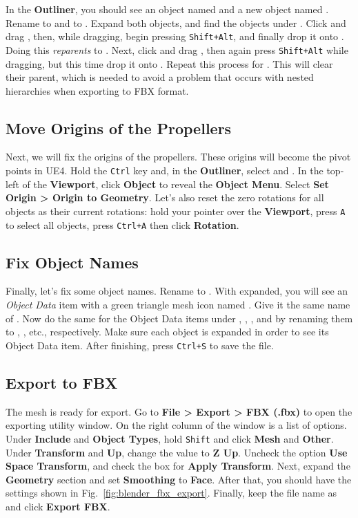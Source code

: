 In the \textbf{Outliner}, you should see an object named  and a new object named . Rename  to  and  to . Expand both  objects, and find the  objects under . Click and drag , then, while dragging, begin pressing \texttt{Shift+Alt}, and finally drop it onto . Doing this \textit{reparents}  to . Next, click and drag , then again press \texttt{Shift+Alt} while dragging, but this time drop it onto . Repeat this process for . This will clear their parent, which is needed to avoid a problem that occurs with nested hierarchies when exporting to FBX format.

\subsection{Move Origins of the Propellers}\label{sec:origins_props}
Next, we will fix the origins of the propellers. These origins will become the pivot points in UE4. Hold the \texttt{Ctrl} key and, in the \textbf{Outliner}, select  and . In the top-left of the \textbf{Viewport}, click \textbf{Object} to reveal the \textbf{Object Menu}. Select \textbf{Set Origin > Origin to Geometry}. Let's also reset the zero rotations for all objects as their current rotations: hold your pointer over the \textbf{Viewport}, press \texttt{A} to select all objects, press \texttt{Ctrl+A} then click \textbf{Rotation}.

\subsection{Fix Object Names}
Finally, let's fix some object names. Rename  to . With  expanded, you will see an \textit{Object Data} item with a green triangle mesh icon named . Give it the same name of . Now do the same for the Object Data items under , , , and  by renaming them to , , etc., respectively. Make sure each object is expanded in order to see its Object Data item. After finishing, press \texttt{Ctrl+S} to save the file.

\subsection{Export to FBX}
The mesh is ready for export. Go to \textbf{File > Export > FBX (.fbx)} to open the exporting utility window. On the right column of the window is a list of options. Under \textbf{Include} and \textbf{Object Types}, hold \texttt{Shift} and click \textbf{Mesh} and \textbf{Other}. Under \textbf{Transform} and \textbf{Up}, change the value to \textbf{Z Up}. Uncheck the option \textbf{Use Space Transform}, and check the box for \textbf{Apply Transform}. Next, expand the \textbf{Geometry} section and set \textbf{Smoothing} to \textbf{Face}. After that, you should have the settings shown in Fig.~\ref{fig:blender_fbx_export}. Finally, keep the file name as  and click \textbf{Export FBX}.

